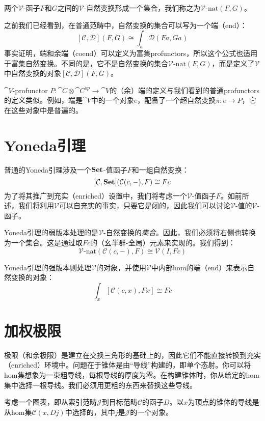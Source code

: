 \documentclass[DaoFP]{subfiles}
\begin{document}
两个$\mathcal V$-函子$F$和$G$之间的$\mathcal V$-自然变换形成一个集合，我们称之为$\mathcal V\text{-nat} (F, G)$。

之前我们已经看到，在普通范畴中，自然变换的集合可以写为一个端（end）：
\[ [\mathcal C, \mathcal D](F, G) \cong \int_a \mathcal D(F a, G a) \]
事实证明，端和余端（coend）可以定义为富集profunctors，所以这个公式也适用于富集自然变换。不同的是，它不是自然变换的集合$\mathcal V\text{-nat} (F, G)$，而是定义了$\mathcal V$中自然变换的对象$[\mathcal C, \mathcal D](F, G)$。

$\cat V$-profunctor $P \colon \cat C \otimes \cat C^{op} \to \cat V$的（余）端的定义与我们看到的普通profunctors的定义类似。例如，端是$\cat V$中的一个对象$e$，配备了一个超自然变换$\pi \colon e \to P$，它在这些对象中是普遍的。

\section{Yoneda引理}

普通的Yoneda引理涉及一个$\mathbf{Set}$-值函子$F$和一组自然变换：
\[ [\mathcal C, \mathbf{Set}]( \mathcal C(c, -), F) \cong F c \]
为了将其推广到充实（enriched）设置中，我们将考虑一个$\mathcal V$-值函子$F$。如前所述，我们将利用$\mathcal V$可以自充实的事实，只要它是闭的，因此我们可以讨论$\mathcal V$-值的$\mathcal V$-函子。

Yoneda引理的弱版本处理的是$\mathcal V$-自然变换的\emph{集合}。因此，我们必须将右侧也转换为一个集合。这是通过取$F c$的（幺半群-全局）元素来实现的。我们得到：
\[ \mathcal V\text{-nat} ( \mathcal C(c, -), F) \cong \mathcal V(I, F c) \]

Yoneda引理的强版本则处理$\mathcal V$的对象，并使用$\mathcal V$中内部hom的端（end）来表示自然变换的对象：
\[ \int_x [\mathcal C( c, x), F x] \cong F c \]

\section{加权极限}

极限（和余极限）是建立在交换三角形的基础上的，因此它们不能直接转换到充实（enriched）环境中。问题在于锥体是由“导线”构建的，即单个态射。你可以将hom集想象为一束粗导线，每根导线的厚度为零。在构建锥体时，你从给定的hom集中选择一根导线。我们必须用更粗的东西来替换这些导线。

考虑一个图表，即从索引范畴$\mathcal J$到目标范畴$\mathcal C$的函子$D$。以$x$为顶点的锥体的导线是从hom集$\mathcal C(x, D j)$中选择的，其中$j$是$\mathcal J$的一个对象。
\end{document}
